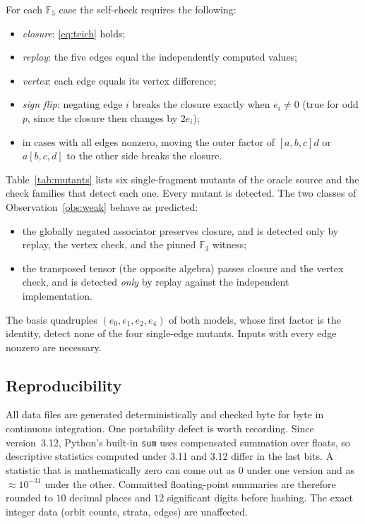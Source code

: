 \documentclass[11pt]{amsart}
\theoremstyle{definition}
\theoremstyle{remark}
\newcommand{\F}{\mathbb{F}}
\newcommand{\assoc}[3]{[#1,#2,#3]}
\begin{document}
For each $\F_5$ case the self-check requires the following:
\begin{itemize}
\item \emph{closure}: \eqref{eq:teich} holds;
\item \emph{replay}: the five edges equal the independently computed values;
\item \emph{vertex}: each edge equals its vertex difference;
\item \emph{sign flip}: negating edge $i$ breaks the closure exactly when
  $e_i\neq0$ (true for odd $p$, since the closure then changes by $2e_i$);
\item in cases with all edges nonzero, moving the outer factor of
  $\assoc abc d$ or $a\assoc bcd$ to the other side breaks the closure.
\end{itemize}

Table~\ref{tab:mutants} lists six single-fragment mutants of the oracle source
and the check families that detect each one. Every mutant is detected. The
two classes of Observation~\ref{obs:weak} behave as predicted:
\begin{itemize}
\item the globally negated associator preserves closure, and is detected only
  by replay, the vertex check, and the pinned $\F_3$ witness;
\item the transposed tensor (the opposite algebra) passes closure and the
  vertex check, and is detected \emph{only} by replay against the independent
  implementation.
\end{itemize}
The basis quadruples $(e_0,e_1,e_2,e_4)$ of both models, whose first factor is
the identity, detect none of the four single-edge mutants. Inputs with every edge
nonzero are necessary.

\begin{table}[t]
\centering
\small

\caption{Mutation analysis of the Lean oracle: check families that report
failure for each mutant, and the number of failing named checks. Generated by
\texttt{scripts/lean\_mutation\_suite.py}
(\texttt{data/n2/oracle-mutants-v1.json}).}
\label{tab:mutants}
\end{table}

\subsection{Reproducibility}
All data files are generated deterministically and checked byte for byte in
continuous integration. One portability defect is worth recording. Since
version~3.12, Python's built-in \texttt{sum} uses compensated summation over
floats, so descriptive statistics computed under 3.11 and 3.12 differ in the
last bits. A statistic that is mathematically zero can come out as $0$ under
one version and as $\approx10^{-31}$ under the other. Committed
floating-point summaries are therefore rounded to $10$ decimal places and
$12$ significant digits before hashing. The exact integer data (orbit counts,
strata, edges) are unaffected.
\end{document}
